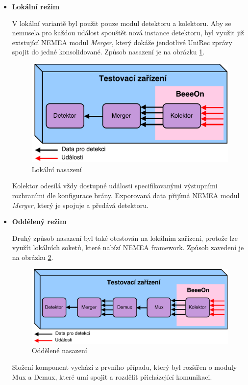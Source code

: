  \begin{itemize}
  \item \textbf{Lokální režim}
  
  V lokální variantě byl použit pouze modul detektoru a kolektoru. Aby se nemusela pro každou 
  událost spouštět nová instance detektoru, byl využit již existující NEMEA modul \textit{Merger},
  který 
  dokáže jendotlivé UniRec zprávy spojit do jedné konsolidované. Způsob nasazení je na obrázku 
  \ref{obr.option1}.
  \begin{figure}[ht]
   \begin{center}
   \includegraphics[scale=0.5]{pictures/deploy-option1}
   \caption{Lokální nasazení}
   \label{obr.option1}
   \end{center}
   \end{figure}
   
   Kolektor odesílá vždy dostupné události specifikovanými výstupními rozhraními dle konfigurace brány.
   Exporovaná data přijímá NEMEA modul \textit{Merger}, který je spojuje a předává detektoru.
   
  \item \textbf{Oddělený režim}
  
  Druhý způsob nasazení byl také otestován na lokálním zařízení, protože lze využít lokálních
  soketů, které nabízí NEMEA framework. Způsob zavedení je na obrázku \ref{obr.option2}.
 
  \begin{figure}[ht]
   \begin{center}
   \includegraphics[scale=0.5]{pictures/deploy-option2}
   \caption{Oddělené nasazení}
   \label{obr.option2}
   \end{center}
   \end{figure}
   
   Složení komponent vychází z prvního případu, který byl rozšířen o moduly Mux a Demux, které 
   umí spojit a rozdělit přicházející komunikaci.
 \end{itemize}
 
